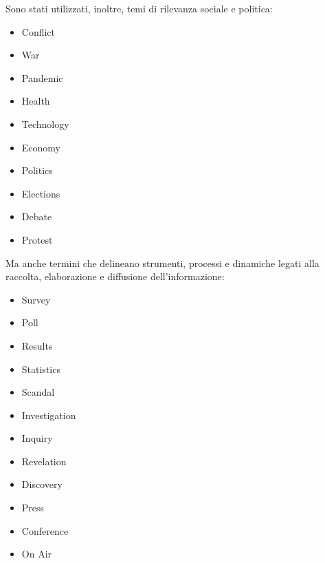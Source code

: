 \documentclass[12pt]{article}
\begin{document}
	Sono stati utilizzati, inoltre, temi di rilevanza sociale e politica:
	\begin{itemize}[label=] 
		\item Conflict
		\item War
		\item Pandemic
		\item Health
		\item Technology
		\item Economy
		\item Politics
		\item Elections
		\item Debate
		\item Protest
	\end{itemize}
	Ma anche termini che delineano strumenti, processi e dinamiche legati alla raccolta, elaborazione e diffusione dell’informazione:
	\begin{itemize}[label=] 
		\item Survey
		\item Poll
		\item Results
		\item Statistics
		\item Scandal
		\item Investigation
		\item Inquiry
		\item Revelation
		\item Discovery
		\item Press
		\item Conference
		\item On Air
	\end{itemize}
\end{document}
